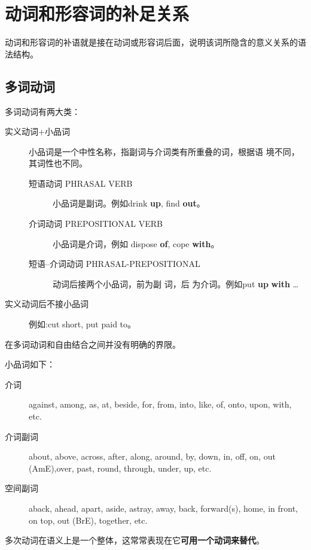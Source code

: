 
\section{动词和形容词的补足关系}

动词和形容词的补语就是接在动词或形容词后面，说明该词所隐含的意义关系的语法结构。

\subsection{多词动词}

多词动词有两大类：
\begin{description}
\item[实义动词+小品词] 小品词是一个中性名称，指副词与介词类有所重叠的词，根据语
境不同，其词性也不同。
  \begin{description}
  \item[短语动词 PHRASAL VERB] 小品词是副词。例如drink \textbf{up}, find
\textbf{out}。

  \item[介词动词 PREPOSITIONAL VERB] 小品词是介词，例如 dispose \textbf{of},
cope \textbf{with}。

  \item[短语--介词动词 PHRASAL-PREPOSITIONAL] 动词后接两个小品词，前为副 词，后
为介词。例如put \textbf{up} \textbf{with} \ldots{}
  \end{description}

\item[实义动词后不接小品词] 例如:cut short, put paid to。

\end{description}

在多词动词和自由结合之间并没有明确的界限。

小品词如下：
\begin{description}
\item[介词] against, among, as, at, beside, for, from, into, like, of, onto,
upon, with, etc.

\item[介词副词] about, above, across, after, along, around, by, down, in, off,
on, out (AmE),over, past, round, through, under, up, etc.

\item[空间副词] aback, ahead, apart, aside, astray, away, back, forward(s),
home, in front, on top, out (BrE), together, etc.

\end{description}

多次动词在语义上是一个整体，这常常表现在它\textbf{可用一个动词来替代}。
